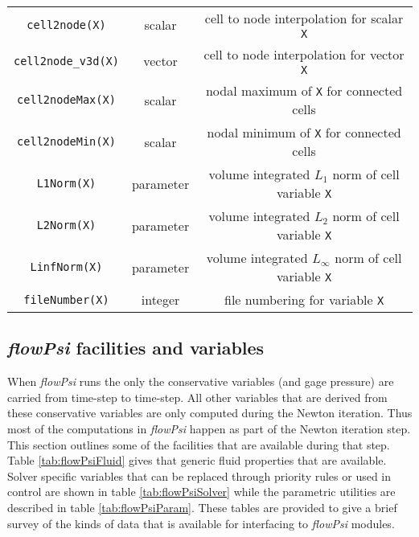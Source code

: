 \documentclass[letterpaper,twoside]{article}
\begin{document}
\begin{table}
\begin{center}
\begin{tabular}{|c|c|c|}
{\tt cell2node(X)} & scalar & cell to node interpolation for scalar {\tt X}\\
{\tt cell2node\_v3d(X)} & vector &cell to node interpolation for vector {\tt X}\\
{\tt cell2nodeMax(X)} & scalar & nodal maximum of {\tt X} for connected cells\\
{\tt cell2nodeMin(X)} & scalar & nodal minimum of {\tt X} for connected cells\\
{\tt L1Norm(X)} & parameter & volume integrated $L_1$ norm of cell variable {\tt X}\\
{\tt L2Norm(X)} & parameter & volume integrated $L_2$ norm of cell variable {\tt X}\\
{\tt LinfNorm(X)} & parameter & volume integrated $L_\infty$ norm of cell variable {\tt X}\\
{\tt fileNumber(X)} & integer & file numbering for variable {\tt X}\\
\hline
\end{tabular}
\end{center}
\end{table}
\clearpage
\subsection{{\it flowPsi} facilities and variables}

When {\it flowPsi} runs the only the conservative variables (and gage
pressure) are carried from time-step to time-step.  All other
variables that are derived from these conservative variables are only
computed during the Newton iteration.  Thus most of the computations
in {\it flowPsi} happen as part of the Newton iteration step.  This section
outlines some of the facilities that are available during that step.
Table \ref{tab:flowPsiFluid} gives that generic fluid properties that are
available.  Solver specific variables that can be replaced through
priority rules or used in control are shown in table
\ref{tab:flowPsiSolver} while the parametric utilities are described in
table \ref{tab:flowPsiParam}.  These tables are provided to give a brief
survey of the kinds of data that is available for interfacing to {\it flowPsi}
modules.
\end{document}
